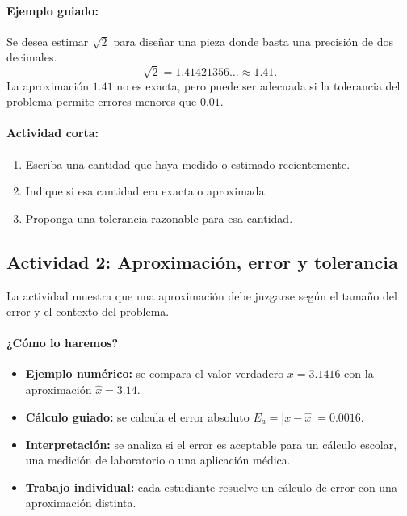 \documentclass[a4,11pt]{aleph-notas}
\begin{document}
\paragraph{Ejemplo guiado:}
Se desea estimar $\sqrt{2}$ para diseñar una pieza donde basta una precisión de dos decimales.
\[
    \sqrt{2}=1.41421356\ldots \approx 1.41.
\]
La aproximación $1.41$ no es exacta, pero puede ser adecuada si la tolerancia del problema permite errores menores que $0.01$.

\paragraph{Actividad corta:}
\begin{enumerate}[leftmargin=*]
    \item Escriba una cantidad que haya medido o estimado recientemente.
    \item Indique si esa cantidad era exacta o aproximada.
    \item Proponga una tolerancia razonable para esa cantidad.
\end{enumerate}

\subsection*{Actividad 2: Aproximación, error y tolerancia}

La actividad muestra que una aproximación debe juzgarse según el tamaño del error y el contexto del problema.

\paragraph{¿Cómo lo haremos?}
\begin{itemize}[leftmargin=*]
    \item \textbf{Ejemplo numérico:} se compara el valor verdadero $x=3.1416$ con la aproximación $\widehat{x}=3.14$.
    \item \textbf{Cálculo guiado:} se calcula el error absoluto $E_a=|x-\widehat{x}|=0.0016$.
    \item \textbf{Interpretación:} se analiza si el error es aceptable para un cálculo escolar, una medición de laboratorio o una aplicación médica.
    \item \textbf{Trabajo individual:} cada estudiante resuelve un cálculo de error con una aproximación distinta.
\end{itemize}
\end{document}
